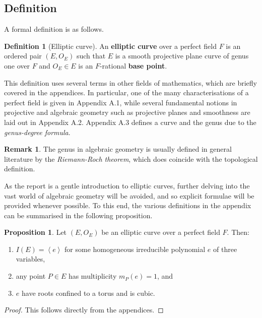 \documentclass{article}
\newcommand{\rb}[1]{\left( #1 \right)}
\newcommand{\ab}[1]{\left\langle #1 \right\rangle}
\theoremstyle{definition}\newtheorem*{definition}{Definition}
\theoremstyle{definition}\newtheorem*{example}{Example}
\theoremstyle{definition}\newtheorem*{remark}{Remark}
\newtheorem{proposition}{Proposition}[subsection]
\begin{document}
\subsection{Definition}

A formal definition is as follows.

\begin{definition}[Elliptic curve]
An \textbf{elliptic curve} over a perfect field $ F $ is an ordered pair $ \rb{E, O_E} $ such that $ E $ is a smooth projective plane curve of genus one over $ F $ and $ O_E \in E $ is an $ F $-rational \textbf{base point}.
\end{definition}

This definition uses several terms in other fields of mathematics, which are briefly covered in the appendices. In particular, one of the many characterisations of a perfect field is given in Appendix A.1, while several fundamental notions in projective and algebraic geometry such as projective planes and smoothness are laid out in Appendix A.2. Appendix A.3 defines a curve and the genus due to the \emph{genus-degree formula}.

\begin{remark}
The genus in algebraic geometry is usually defined in general literature by the \emph{Riemann-Roch theorem}, which does coincide with the topological definition.
\end{remark}

As the report is a gentle introduction to elliptic curves, further delving into the vast world of algebraic geometry will be avoided, and so explicit formulae will be provided whenever possible. To this end, the various definitions in the appendix can be summarised in the following proposition.

\begin{proposition}
\label{prop:appendices}
Let $ \rb{E, O_E} $ be an elliptic curve over a perfect field $ F $. Then:
\begin{enumerate}
\item $ I\rb{E} = \ab{e} $ for some homogeneous irreducible polynomial $ e $ of three variables,
\item any point $ P \in E $ has multiplicity $ m_P\rb{e} = 1 $, and
\item $ e $ have roots confined to a torus and is cubic.
\end{enumerate}
\end{proposition}

\begin{proof}
This follows directly from the appendices.
\end{proof}
\end{document}
